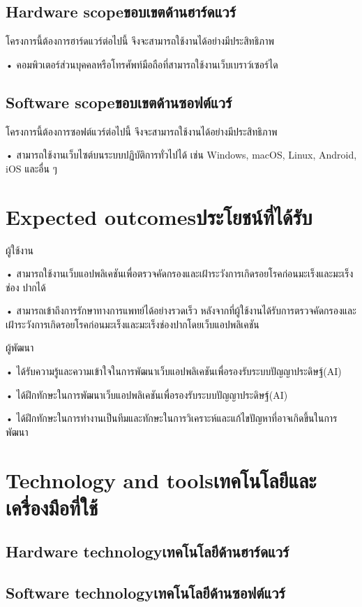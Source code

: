 \subsection{\ifenglish Hardware scope\else ขอบเขตด้านฮาร์ดแวร์\fi}
โครงการนี้ต้องการฮาร์ดแวร์ต่อไปนี้ จึงจะสามารถใช้งานได้อย่างมีประสิทธิภาพ

• คอมพิวเตอร์ส่วนบุคคลหรือโทรศัพท์มือถือที่สามารถใช้งานเว็บเบราว์เซอร์ได
\subsection{\ifenglish Software scope\else ขอบเขตด้านซอฟต์แวร์\fi}
โครงการนี้ต้องการซอฟต์แวร์ต่อไปนี้ จึงจะสามารถใช้งานได้อย่างมีประสิทธิภาพ

• สามารถใช้งานเว็บไซต์บนระบบปฏิบัติการทั่วไปได้ เช่น Windows, macOS, Linux, Android, iOS และอื่น ๆ

\section{\ifenglish Expected outcomes\else ประโยชน์ที่ได้รับ\fi}
ผู้ใช้งาน

• สามารถใช้งานเว็บแอปพลิเคชันเพื่อตรวจคัดกรองและเฝ้าระวังการเกิดรอยโรคก่อนมะเร็งและมะเร็งช่อง
ปากได้

• สามารถเข้าถึงการรักษาทางการแพทย์ได้อย่างรวดเร็ว หลังจากที่ผู้ใช้งานได้รับการตรวจคัดกรองและ
เฝ้าระวังการเกิดรอยโรคก่อนมะเร็งและมะเร็งช่องปากโดยเว็บแอปพลิเคชัน

\noindent ผู้พัฒนา

• ได้รับความรู้และความเข้าใจในการพัฒนาเว็บแอปพลิเคชันเพื่อรองรับระบบปัญญาประดิษฐ์(AI)

• ได้ฝึกทักษะในการพัฒนาเว็บแอปพลิเคชันเพื่อรองรับระบบปัญญาประดิษฐ์(AI)

• ได้ฝึกทักษะในการทํางานเป็นทีมและทักษะในการวิเคราะห์และแก้ไขปัญหาที่อาจเกิดขึ้นในการพัฒนา

\section{\ifenglish Technology and tools\else เทคโนโลยีและเครื่องมือที่ใช้\fi}

\subsection{\ifenglish Hardware technology\else เทคโนโลยีด้านฮาร์ดแวร์\fi}

\subsection{\ifenglish Software technology\else เทคโนโลยีด้านซอฟต์แวร์\fi}

